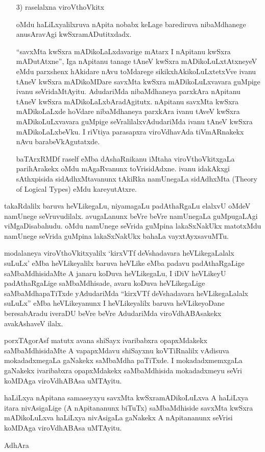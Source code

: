 \begin{itemize}
\item[{\rm 3)}] raselalxna viroVthoVkitx

oMdu haLiLxyalilxruva nApita nobabx keLage barediruva nibaMdhanege anusAravAgi kwSxramADutitxdadx.

``savxMta kwSxra mADikoLaLxdavarige mAtarx I nApitanu kwSxra mADutAtxne'', Iga nApitanu tanage tAneV kwSxra mADikoLuLxtAtxneyeV eMdu parxshenx hAkidare nAvu toMdarege sikikxhAkikoLuLxtetxVve ivanu tAneV kwSxra mADikoMDare savxMta kwSxra mADikoLuLxvavara guMpige ivanu seVridaMtAyitu. AdudariMda nibaMdhaneya parxkAra nApitanu tAneV kwSxra mADikoLaLxbAradAgitutx. nApitanu savxMta kwSxra mADikoLaLxde hoVdare nibaMdhaneya parxkAra ivanu tAveV kwSxra mADikoLuLxvavara guMpige seVralilalxvAdudariMda ivanu tAneV kwSxra mADikoLaLxbeVku. I riVtiya parasapxra viroVdhavAda tiVmARnakekx nAvu barabeVkAgutatxde.

baTArxRMDf raself eMba dAshaRnikanu iMtaha viroVthoVkitxgaLa parihArakekx oMdu mAgaRvanunx toVrisidAdxne. ivanu idakAkxgi sAthxpisida sidAdhxMtavanunx tAkiRka namUnegaLa sidAdhxMta {\rm (Theory of Logical Types)} eMdu kareyutAtxre.
\end{itemize}

takaRdalilx baruva heVLikegaLu, niyamagaLu padAthaRgaLu elalxvU oMdeV namUnege seVruvudilalx. avugaLanunx beVre beVre namUnegaLa guMpugaLAgi viMgaDisabahudu. oMdu namUnege seVrida guMpina lakaSxNakUkx matotxMdu namUnege seVrida guMpina lakaSxNakUkx bahaLa vayxtAyxsavuMTu.

modalaneya viroVthoVkitxyalilx `kirxVTf deVshadavara heVLikegaLalalx suLuLx' eMba heVLikeyalilx baruva heVLike eMba padavu padAthaRgaLige saMbaMdhisidaMte A janaru koDuva heVLikegaLu, I iDiV heVLikeyU padAthaRgaLige saMbaMdhisade, avaru koDuva heVLikegaLige saMbaMdhapaTiTxde yAdudariMda ``kirxVTf deVshadavara heVLikegaLalalx suLuLx'' eMba heVLikeyanunx I heVLikeyalilx baruva heVLikeyoDane beresabAradu iveraDU beVre beVre AdudariMda viroVdhABAsakekx avakAshaveV ilalx.

porxTAgorAsf matutx avana shiSayx ivaribabxra opapxMdakekx saMbaMdhisidaMte A vapapxMdavu shiSayxnu koVTiRnalilx vAdisuva mokadadxmegaLa gaNakekx saMbaMdha paTiTxde. I mokadadxmemxgaLa gaNakekx ivaribabxra opapxMdakekx saMbaMdhisida mokadadxmeyu seVri koMDAga viroVdhABAsa uMTAyitu.

haLiLxya nApitana samaseyxyu savxMta kwSxramADikoLuLxva A haLiLxya itara nivAsigaLige (A nApitananunx biTuTx) saMbaMdhiside savxMta kwSxra mADikoLuLxva haLiLxya nivAsigaLa gaNakekx A nApitananunx seVrisi koMDAga viroVdhABAsa uMTAyitu.
\begin{flushright}
AdhAra
\end{flushright}
